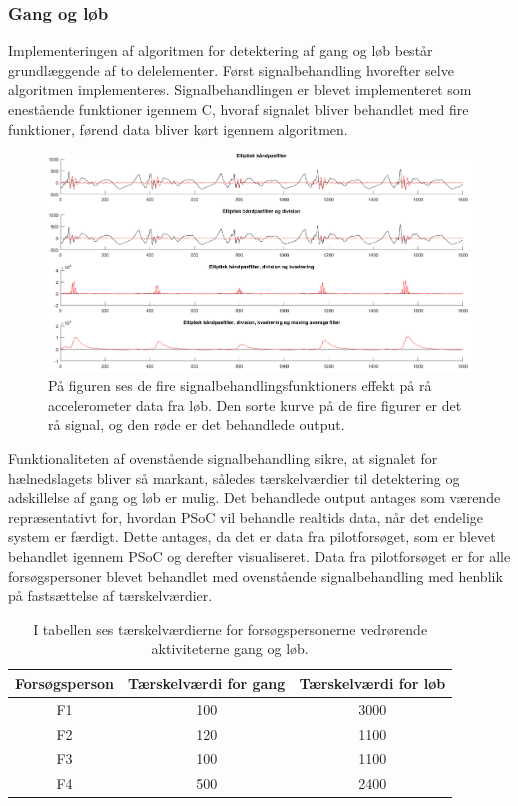 \subsubsection{Gang og løb}
Implementeringen af algoritmen for detektering af gang og løb består grundlæggende af to delelementer. Først signalbehandling hvorefter selve algoritmen implementeres. Signalbehandlingen er blevet implementeret som enestående funktioner igennem C, hvoraf signalet bliver behandlet med fire funktioner, førend data bliver kørt igennem algoritmen.
\begin{figure}[H]
	\centering
	\includegraphics[scale=0.4]{figures/cDesign/signalbehandling_psoc.png}
	\caption{På figuren ses de fire signalbehandlingsfunktioners effekt på rå accelerometer data fra løb. Den sorte kurve på de fire figurer er det rå signal, og den røde er det behandlede output.}
	\label{fig:algoritme_cykling2}
\end{figure}
Funktionaliteten af ovenstående signalbehandling sikre, at signalet for hælnedslagets bliver så markant, således tærskelværdier til detektering og adskillelse af gang og løb er mulig. Det behandlede output antages som værende repræsentativt for, hvordan PSoC vil behandle realtids data, når det endelige system er færdigt. Dette antages, da det er data fra pilotforsøget, som er blevet behandlet igennem PSoC og derefter visualiseret. Data fra pilotforsøget er for alle forsøgspersoner blevet behandlet med ovenstående signalbehandling med henblik på fastsættelse af tærskelværdier. 
\begin{table}[H]
	\centering
	\begin{tabular}{ccc}
		\hline
		\rowcolor[HTML]{C0C0C0} 
		Forsøgsperson & Tærskelværdi for gang & Tærskelværdi for løb \\ \hline
		\rowcolor[HTML]{FFFFFF} 
		F1 & 100 & 3000 \\ \hline
		\rowcolor[HTML]{FFFFFF} 
		F2 & 120 & 1100 \\ \hline
		\rowcolor[HTML]{FFFFFF} 
		F3 & 100 & 1100 \\ \hline
		\rowcolor[HTML]{FFFFFF} 
		F4 & 500 & 2400 \\ \hline
	\end{tabular}
	\caption{I tabellen ses tærskelværdierne for forsøgspersonerne vedrørende aktiviteterne gang og løb.}
	\label{tab:individuel_taerskel}
\end{table}\vspace{-0.5cm}
